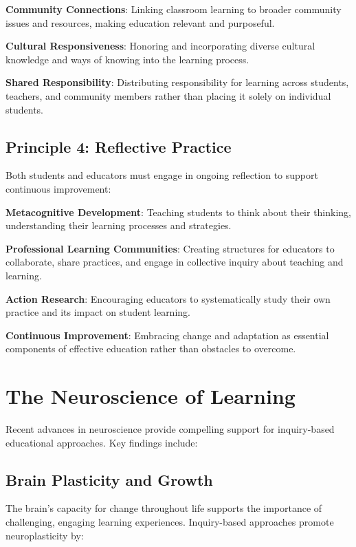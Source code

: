 \documentclass[
  Letterpaper,
]{scrbook}
\begin{document}
\textbf{Community Connections}: Linking classroom learning to broader
community issues and resources, making education relevant and
purposeful.

\textbf{Cultural Responsiveness}: Honoring and incorporating diverse
cultural knowledge and ways of knowing into the learning process.

\textbf{Shared Responsibility}: Distributing responsibility for learning
across students, teachers, and community members rather than placing it
solely on individual students.

\subsection{Principle 4: Reflective
Practice}\label{principle-4-reflective-practice}

Both students and educators must engage in ongoing reflection to support
continuous improvement:

\textbf{Metacognitive Development}: Teaching students to think about
their thinking, understanding their learning processes and strategies.

\textbf{Professional Learning Communities}: Creating structures for
educators to collaborate, share practices, and engage in collective
inquiry about teaching and learning.

\textbf{Action Research}: Encouraging educators to systematically study
their own practice and its impact on student learning.

\textbf{Continuous Improvement}: Embracing change and adaptation as
essential components of effective education rather than obstacles to
overcome.

\section{The Neuroscience of
Learning}\label{the-neuroscience-of-learning}

Recent advances in neuroscience provide compelling support for
inquiry-based educational approaches. Key findings include:

\subsection{Brain Plasticity and
Growth}\label{brain-plasticity-and-growth}

The brain's capacity for change throughout life supports the importance
of challenging, engaging learning experiences. Inquiry-based approaches
promote neuroplasticity by:
\end{document}
